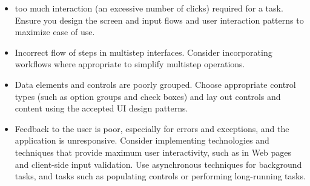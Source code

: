 \documentclass[../Psychological_system_web_application.tex]{subfiles}
\begin{document}
					\begin{itemize}
						\item
							too much interaction (an excessive number of clicks) required for a task. Ensure you design the screen and input flows and user interaction patterns to maximize ease of use.
						\item
							Incorrect flow of steps in multistep interfaces. Consider incorporating workflows where appropriate to simplify multistep operations.
						\item
							Data elements and controls are poorly grouped. Choose appropriate control types (such as option groups and check boxes) and lay out controls and content using the accepted UI design patterns.
						\item
							Feedback to the user is poor, especially for errors and exceptions, and the application is unresponsive. Consider implementing technologies and techniques that provide maximum user interactivity, such as  in Web pages and client-side input validation. Use asynchronous techniques for background tasks, and tasks such as populating controls or performing long-running tasks.
						
					\end{itemize}
\end{document}
